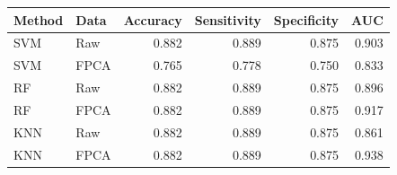 
\begin{tabular}{llrrrr}
\toprule
Method & Data & Accuracy & Sensitivity & Specificity & AUC\\
\midrule
SVM & Raw & 0.882 & 0.889 & 0.875 & 0.903\\
SVM & FPCA & 0.765 & 0.778 & 0.750 & 0.833\\
RF & Raw & 0.882 & 0.889 & 0.875 & 0.896\\
RF & FPCA & 0.882 & 0.889 & 0.875 & 0.917\\
KNN & Raw & 0.882 & 0.889 & 0.875 & 0.861\\
\addlinespace
KNN & FPCA & 0.882 & 0.889 & 0.875 & 0.938\\
\bottomrule
\end{tabular}
